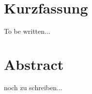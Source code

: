 \section*{Kurzfassung}

\linespread{1.08}\selectfont
To be written...

\section*{Abstract}

\linespread{1.08}\selectfont
noch zu schreiben...
